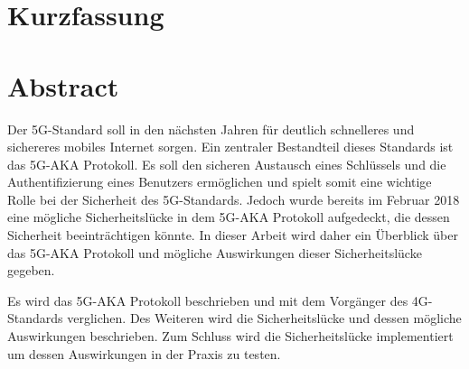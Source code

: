 \ifdeutsch
  \section*{Kurzfassung}
\else
  \section*{Abstract}
\fi

Der 5G-Standard soll in den nächsten Jahren für deutlich schnelleres und sichereres mobiles Internet sorgen.
Ein zentraler Bestandteil dieses Standards ist das 5G-AKA Protokoll.
Es soll den sicheren Austausch eines Schlüssels und die Authentifizierung eines Benutzers ermöglichen und spielt somit eine wichtige Rolle bei der Sicherheit des 5G-Standards.
Jedoch wurde bereits im Februar 2018 eine mögliche Sicherheitslücke in dem 5G-AKA Protokoll aufgedeckt, die dessen Sicherheit beeinträchtigen könnte.
In dieser Arbeit wird daher ein Überblick über das 5G-AKA Protokoll und mögliche Auswirkungen dieser Sicherheitslücke gegeben.

Es wird das 5G-AKA Protokoll beschrieben und mit dem Vorgänger des 4G-Standards verglichen.
Des Weiteren wird die Sicherheitslücke und dessen mögliche Auswirkungen beschrieben.
Zum Schluss wird die Sicherheitslücke implementiert um dessen Auswirkungen in der Praxis zu testen.
